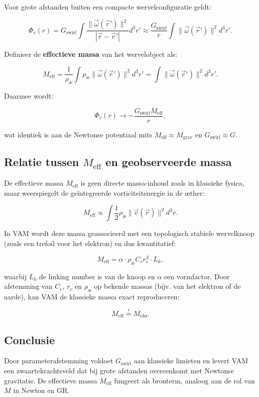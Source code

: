 Voor grote afstanden buiten een compacte wervelconfiguratie geldt:

\begin{equation}
\Phi_v(r) = G_\text{swirl} \int \frac{\|\vec{\omega}(\vec{r}')\|^2}{|\vec{r} - \vec{r}'|} d^3r' \approx \frac{G_\text{swirl}}{r} \int \|\vec{\omega}(\vec{r}')\|^2 d^3r'.
\end{equation}

Definieer de \textbf{effectieve massa} van het wervelobject als:

\begin{equation}
M_\text{eff} = \frac{1}{\rho_\text{æ}} \int \rho_\text{æ} \|\vec{\omega}(\vec{r}')\|^2 d^3r' = \int \|\vec{\omega}(\vec{r}')\|^2 d^3r'.
\end{equation}

Daarmee wordt:

\begin{equation}
\Phi_v(r) \to -\frac{G_\text{swirl} M_\text{eff}}{r},
\end{equation}

wat identiek is aan de Newtonse potentiaal mits $M_\text{eff} \approx M_\text{grav}$ en $G_\text{swirl} \approx G$.

\subsection{Relatie tussen $M_\text{eff}$ en geobserveerde massa}

De effectieve massa $M_\text{eff}$ is geen directe massa-inhoud zoals in klassieke fysica, maar weerspiegelt de geïntegreerde vorticiteitenergie in de æther:

\begin{equation}
  M_\text{eff} \propto \int \frac{1}{2} \rho_\text{æ} \|\vec{v}(\vec{r})\|^2 d^3r.
\end{equation}

In VAM wordt deze massa geassocieerd met een topologisch stabiele wervelknoop (zoals een trefoil voor het elektron) en dus kwantitatief:

\begin{equation}
M_\text{eff} = \alpha \cdot \rho_\text{æ} C_e r_c^3 \cdot L_k,
\end{equation}

waarbij $L_k$ de linking number is van de knoop en $\alpha$ een vormfactor. Door afstemming van $C_e$, $r_c$ en $\rho_\text{æ}$ op bekende massa\rqs s (bijv. van het elektron of de aarde), kan VAM de klassieke massa exact reproduceren:

\begin{equation}
M_\text{eff} \overset{!}{=} M_\text{obs}.
\end{equation}

\subsection{Conclusie}

Door parameterafstemming voldoet $G_\text{swirl}$ aan klassieke limieten en levert VAM een zwaartekrachtsveld dat bij grote afstanden overeenkomt met Newtonse gravitatie. De effectieve massa $M_\text{eff}$ fungeert als bronterm, analoog aan de rol van $M$ in Newton en GR.